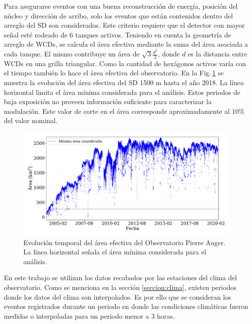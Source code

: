 	Para asegurarse eventos con una buena reconstrucción de  energía, posición del núcleo y dirección de arribo, solo los eventos que están contenidos dentro del arreglo del SD son considerados. Este criterio requiere que el detector con mayor señal esté rodeado de 6 tanques activos. Teniendo en cuenta la geometría de arreglo de WCDs, se calcula el área efectiva mediante la suma del área asociada a cada tanque. El mismo contribuye un área de $\sqrt{3} \frac{d^2}{2}$, donde $d$ es la distancia entre WCDs en una grilla triangular. Como la cantidad de hexágonos activos varía con el tiempo también lo hace  el área efectiva del observatorio. En la Fig.\,\ref{fig:area} se muestra la evolución del área efectiva del SD 1500 m hasta el año 2018. La línea horizontal  limita el área mínima considerada para el análisis. Estos periodos de baja exposición no proveen información suficiente para caracterizar la modulación.
	Este valor de corte en el área corresponde aproximadamente al $10\%$ del valor nominal.
	\begin{figure}[H]
		\centering
		\includegraphics[width=\textwidth]{Graphs/clima/area.pdf}
		\caption{Evolución temporal del área efectiva del Observatorio Pierre Auger. La línea horizontal señala el área mínima considerada para el análisis.}
		\label{fig:area}
	\end{figure}

	En este trabajo se utilizan los datos recabados por las estaciones del clima del observatorio. Como se menciona en la sección \ref{seccion:clima}, existen periodos donde los datos del clima son interpolados. Es por ello que se consideran los eventos registrados durante un periodo en donde las condiciones climáticas fueron medidas o interpoladas para un periodo menor a 3 horas. %

